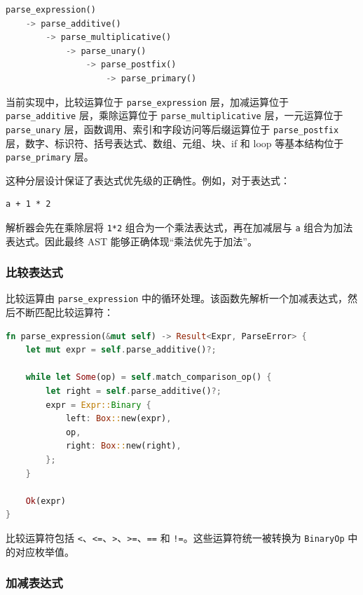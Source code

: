 \documentclass[UTF8,a4paper,12pt]{ctexart}
\begin{document}
\begin{lstlisting}[language=Rust,caption={表达式解析层次}]
parse_expression()
    -> parse_additive()
        -> parse_multiplicative()
            -> parse_unary()
                -> parse_postfix()
                    -> parse_primary()
\end{lstlisting}

当前实现中，比较运算位于 \texttt{parse\_expression} 层，加减运算位于 \texttt{parse\_additive} 层，乘除运算位于 \texttt{parse\_multiplicative} 层，一元运算位于 \texttt{parse\_unary} 层，函数调用、索引和字段访问等后缀运算位于 \texttt{parse\_postfix} 层，数字、标识符、括号表达式、数组、元组、块、if 和 loop 等基本结构位于 \texttt{parse\_primary} 层。

这种分层设计保证了表达式优先级的正确性。例如，对于表达式：

\begin{lstlisting}[caption={表达式优先级示例}]
a + 1 * 2
\end{lstlisting}

解析器会先在乘除层将 \texttt{1*2} 组合为一个乘法表达式，再在加减层与 \texttt{a} 组合为加法表达式。因此最终 AST 能够正确体现“乘法优先于加法”。

\subsubsection{比较表达式}

比较运算由 \texttt{parse\_expression} 中的循环处理。该函数先解析一个加减表达式，然后不断匹配比较运算符：

\begin{lstlisting}[language=Rust,caption={比较表达式解析}]
fn parse_expression(&mut self) -> Result<Expr, ParseError> {
    let mut expr = self.parse_additive()?;

    while let Some(op) = self.match_comparison_op() {
        let right = self.parse_additive()?;
        expr = Expr::Binary {
            left: Box::new(expr),
            op,
            right: Box::new(right),
        };
    }

    Ok(expr)
}
\end{lstlisting}

比较运算符包括 \texttt{<}、\texttt{<=}、\texttt{>}、\texttt{>=}、\texttt{==} 和 \texttt{!=}。这些运算符统一被转换为 \texttt{BinaryOp} 中的对应枚举值。

\subsubsection{加减表达式}
\end{document}
